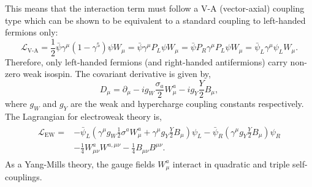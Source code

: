 This means that the interaction term must follow a V-A (vector-axial) coupling type which can be shown to be equivalent to a standard coupling to left-handed fermions only:
\begin{equation}
	\label{eq:v-a_coupling}
	\mathcal{L}_\text{V-A}
	= \frac{1}{2} \bar \psi \gamma^\mu (1 - \gamma^5) \psi W_\mu
	= \bar \psi \gamma^\mu P_L \psi W_\mu
	= \bar \psi P_R \gamma^\mu P_L \psi W_\mu
	= \bar \psi_L \gamma^\mu \psi_L W_\mu.
\end{equation}
Therefore, only left-handed fermions (and right-handed antifermions) carry non-zero weak isospin.
The covariant derivative is given by,
\begin{equation}
	\label{eq:ew_covariant_derivative}
	D_\mu = \partial_\mu - i g_W \frac{\sigma_a}{2} W_\mu^a - i g_Y \frac{Y}{2} B_\mu,
\end{equation}
where $g_W$ and $g_Y$ are the weak and hypercharge coupling constants respectively.
The Lagrangian for electroweak theory is,
\begin{align}
	\begin{split}
		\label{eq:ew_lagrangian}
		\mathcal{L}_\text{EW} = & - \bar{\psi}_L \left( \gamma^\mu g_W \frac{1}{2} \sigma^a W^a_\mu + \gamma^\mu g_Y \frac{Y}{2} B_\mu \right) \psi_L - \bar{\psi}_R \left( \gamma^\mu g_Y \frac{Y}{2} B_\mu \right) \psi_R \\
		                        & - \frac{1}{4} W_{\mu\nu}^a W^{a,\mu\nu} - \frac{1}{4} B_{\mu\nu} B^{\mu\nu}.
	\end{split}
\end{align}
As a Yang-Mills theory, the gauge fields $W_\mu^a$ interact in quadratic and triple self-couplings.

